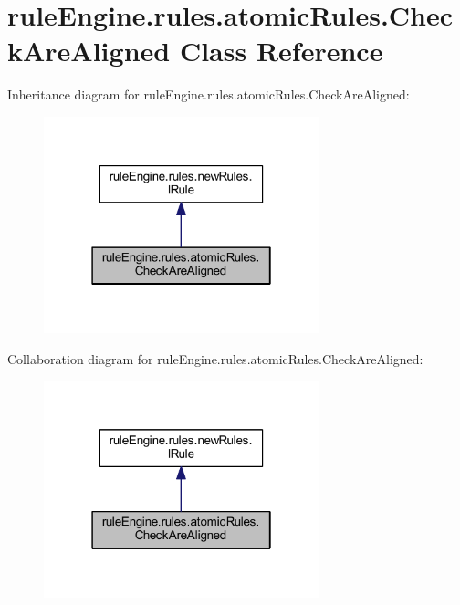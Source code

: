 \hypertarget{classrule_engine_1_1rules_1_1atomic_rules_1_1_check_are_aligned}{}\section{rule\+Engine.\+rules.\+atomic\+Rules.\+Check\+Are\+Aligned Class Reference}
\label{classrule_engine_1_1rules_1_1atomic_rules_1_1_check_are_aligned}


Inheritance diagram for rule\+Engine.\+rules.\+atomic\+Rules.\+Check\+Are\+Aligned\+:
\nopagebreak
\begin{figure}[H]
\begin{center}
\leavevmode
\includegraphics[width=226pt]{classrule_engine_1_1rules_1_1atomic_rules_1_1_check_are_aligned__inherit__graph}
\end{center}
\end{figure}


Collaboration diagram for rule\+Engine.\+rules.\+atomic\+Rules.\+Check\+Are\+Aligned\+:
\nopagebreak
\begin{figure}[H]
\begin{center}
\leavevmode
\includegraphics[width=226pt]{classrule_engine_1_1rules_1_1atomic_rules_1_1_check_are_aligned__coll__graph}
\end{center}
\end{figure}
